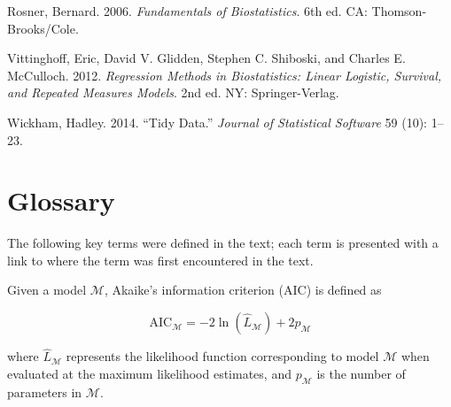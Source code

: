 \documentclass[
  letterpaper,
  DIV=11,
  numbers=noendperiod]{scrreprt}
\providecommand{\tightlist}{%
  \setlength{\itemsep}{0pt}\setlength{\parskip}{0pt}}\usepackage{longtable,booktabs,array}
\newlength{\cslhangindent}
\newlength{\cslentryspacingunit} %
\newenvironment{CSLReferences}[2] %
 {%
  \setlength{\parindent}{0pt}
  \ifodd #1
  \let\oldpar\par
  \def\par{\hangindent=\cslhangindent\oldpar}
  \fi
  \setlength{\parskip}{#2\cslentryspacingunit}
 }%
 {}
\theoremstyle{definition}
\theoremstyle{definition}
\theoremstyle{remark}
\begin{document}

\hypertarget{refs}{}
\begin{CSLReferences}{1}{0}
\leavevmode{}%
Rosner, Bernard. 2006. \emph{Fundamentals of Biostatistics}. 6th ed. CA:
Thomson-Brooks/Cole.

\leavevmode{}%
Vittinghoff, Eric, David V. Glidden, Stephen C. Shiboski, and Charles E.
McCulloch. 2012. \emph{Regression Methods in Biostatistics: Linear
Logistic, Survival, and Repeated Measures Models}. 2nd ed. NY:
Springer-Verlag.

\leavevmode{}%
Wickham, Hadley. 2014. {``Tidy Data.''} \emph{Journal of Statistical
Software} 59 (10): 1--23.

\end{CSLReferences}

\cleardoublepage
{}
{}
\appendix

\hypertarget{glossary}{%
\chapter{Glossary}\label{glossary}}

\providecommand{\norm}[1]{\left\lVert#1\right\rVert}
\providecommand{\abs}[1]{\left\lvert#1\right\rvert}
\providecommand{\dist}[1]{\stackrel{\text{#1}}{\sim}}
\providecommand{\ind}[1]{\mathbb{I}\left(#1\right)}
\providecommand{\bm}[1]{\mathbf{#1}}
\providecommand{\bs}[1]{\boldsymbol{#1}}
\providecommand{\Ell}{\mathcal{L}}
\providecommand{\indep}{\perp\negthickspace\negmedspace\perp}

The following key terms were defined in the text; each term is presented
with a link to where the term was first encountered in the text.

\begin{description}
\tightlist
\item[AIC (Definition~\ref{def-aic})]
Given a model \(\mathcal{M}\), Akaike's information criterion (AIC) is
defined as
\end{description}

\[\text{AIC}_{\mathcal{M}} = -2\ln\left(\widehat{L}_{\mathcal{M}}\right) + 2p_{\mathcal{M}}\]

where \(\widehat{L}_{\mathcal{M}}\) represents the likelihood function
corresponding to model \(\mathcal{M}\) when evaluated at the maximum
likelihood estimates, and \(p_{\mathcal{M}}\) is the number of
parameters in \(\mathcal{M}\).
\end{document}
